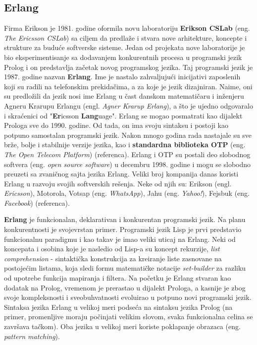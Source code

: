 \documentclass[12pt,oneside]{memoir}
\begin{document}
\newpage

\subsection{Erlang}
Firma Erikson je 1981. godine oformila novu laboratoriju \textbf{Erikson CSLab} (eng. \textit{The Ericsson CSLab}) sa ciljem da predlaže i stvara nove arhitekture, koncepte i strukture za buduće softverske sisteme. Jedan od projekata nove laboratorije  je bio eksperimentisanje sa dodavanjem konkurentnih procesa u programski jezik Prolog i on predstavlja začetak novog programskog jezika. Taj programski jezik je 1987. godine nazvan \textbf{Erlang}. Ime je nastalo zahvaljujući inicijativi zaposlenih koji su radili na telefonskim prekidačima, a  za koje je jezik dizajniran. Naime, oni su predložili da jezik nosi ime Erlang u čast danskom matematičaru i inženjeru Agneru Krarupu Erlangu (engl. \textit{Agner Krarup Erlang}), a što je ujedno odgovaralo i skraćenici od  "\textbf{Er}icsson \textbf{Lang}uage".  Erlang se mogao posmatrati kao dijalekt Prologa sve do 1990. godine. Od tada, on ima svoju sintaksu i postoji kao potpuno samostalan programski
jezik. Nakon mnogo godina rada nastajale su sve brže, bolje i stabilnije verzije jezika, kao i \textbf{standardna biblioteka OTP} (eng. \textit{The Open Telecom Platform}) (referenca). Erlang i OTP su postali deo slobodnog softvera (eng. \textit{open source software}) u decembru 1998. godine i mogu se slobodno preuzeti sa zvaničnog sajta jezika Erlang. Veliki broj kompanija danas koristi Erlang u razvoju svojih softverskih rešenja. Neke od
njih su: Erikson (engl. \textit{Ericsson}), Motorola, Votsap (eng. \textit{WhatsApp}), Jahu (eng. \textit{Yahoo!}),
Fejsbuk (eng. \textit{Facebook}) (referenca).

\textbf{Erlang} je funkcionalan, deklarativan i konkurentan programski jezik. Na planu konkurentnosti je
svojevrstan primer. Programski jezik Lisp je prvi predstavio funkcionalnu paradigmu i kao takav je imao veliki uticaj na Erlang. Neki od koncepata i osobina koje je nasledio od Lisp-a su koncept rekurzije, \textit{list comprehension} - sintaktička konstrukcija za kreiranje liste zasnovane na postojećim listama, koja sledi formu matematičke notacije \textit{set-builder} za razliku od upotrebe funkcija mapiranja i filtera. Na početku je Erlang stvaran kao dodatak na Prolog, vremenom je prerastao
u dijalekt Prologa, a kasnije je zbog svoje kompleksnosti i sveobuhvatnosti evoluirao u potpuno novi programski jezik. Sintaksa jezika Erlang u velikoj meri podseća na sintaksu jezika Prolog (na primer, promenljive moraju počinjati velikim slovom, svaka funkcionalna celina se završava tačkom). Oba jezika u velikoj meri koriste poklapanje obrazaca (eng. \textit{pattern matching}).
\end{document}
